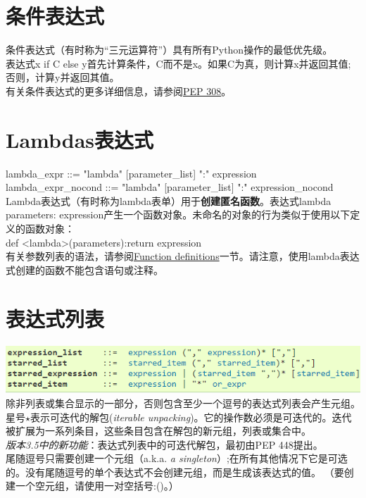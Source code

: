 \documentclass[10pt,UTF8]{ctexart}
\begin{document}
\section{条件表达式}
条件表达式（有时称为“三元运算符”）具有所有Python操作的最低优先级。\\
\indent 表达式x if C else y首先计算条件，C而不是x。如果C为真，则计算x并返回其值;否则，计算y并返回其值。\\
\indent 有关条件表达式的更多详细信息，请参阅\href{https://www.python.org/dev/peps/pep-0308}{PEP 308}。
\section{Lambdas表达式}
lambda_expr ::= "lambda" [parameter_list] ":" expression \\
\indent lambda_expr_nocond ::= "lambda" [parameter_list] ":" expression_nocond\\
\indent Lambda表达式（有时称为lambda表单）用于\textbf{创建匿名函数}。表达式lambda parameters: expression产生一个函数对象。未命名的对象的行为类似于使用以下定义的函数对象：\\
def <lambda>(parameters):return expression\\
\indent 有关参数列表的语法，请参阅\href{https://docs.python.org/3/reference/compound_stmts.html#function}{Function definitions}一节。请注意，使用lambda表达式创建的函数不能包含语句或注释。
\section{表达式列表}
\includegraphics[scale=0.8]{expressionlist.PNG}\\
\indent 除非列表或集合显示的一部分，否则包含至少一个逗号的表达式列表会产生元组。\\
\indent 星号$\star$表示可迭代的解包(\textit{iterable unpacking})。它的操作数必须是可迭代的。迭代被扩展为一系列条目，这些条目包含在解包的新元组，列表或集合中。\\
\indent \textit{版本3.5中的新功能}：表达式列表中的可迭代解包，最初由PEP 448提出。\\
\indent 尾随逗号只需要创建一个元组（a.k.a. \textit{a singleton}）;在所有其他情况下它是可选的。没有尾随逗号的单个表达式不会创建元组，而是生成该表达式的值。 （要创建一个空元组，请使用一对空括号:()。）
\end{document}
